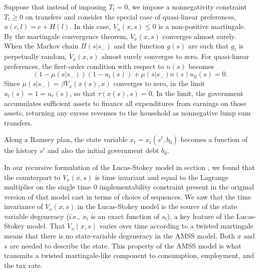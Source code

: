 \medskip

  Suppose that instead of imposing $T_t = 0$, we impose
a nonnegativity constraint $T_t\geq 0$ on  transfers and consider the special case of quasi-linear preferences,
$u(c,l)= c + H(l)$.   In this case,  $V_x(x,s)\leq 0$  is a non-positive martingale.  By the martingale convergence
 theorem, $V_x(x,s)$ converges almost surely.
%
When  the Markov chain $\Pi(s| s_-)$ and the function $g(s)$ are such that $g_t$ is perpetually random,
$V_x(x, s)$ almost surely converges to zero.  %
For  quasi-linear preferences, the first-order condition with respect to $n(s)$ becomes
$$ (1-\mu(s|s_-) ) (1 - u_l(s)) + \mu(s|s_-) n(s) u_{ll}(s) =0  .$$
Since $\mu(s|s_-) = \beta V_x(x(s),x) $ converges to zero, in the limit $u_l(s)= 1 =u_c(s)$, so that $\tau(x(s),s) =0$. In the limit, the government
accumulates sufficient assets
to finance all expenditures from earnings on those assets, returning any excess revenues to the household as nonnegative lump sum transfers.

\medskip


 Along a Ramsey plan, the state variable $x_t = x_t(s^t, b_0)$  becomes a function of the history $s^t$ and also
the initial government debt $b_0$.


\medskip

 In our recursive formulation of the  Lucas-Stokey model in section , we found that the counterpart to $V_x(x,s)$ is time invariant
and equal to
the Lagrange multiplier on the single time $0$ implementability constraint present in the original version of that model cast in terms of choice of sequences.
We saw that the time invariance of $V_x(x,s)$ in the Lucas-Stokey model is the source of the state variable degeneracy (i.e., $x_t$ is an exact function of
$s_t$), a key feature of the Lucas-Stokey model.
That $V_x(x,s)$ varies over time according to a twisted martingale means that there is no state-variable degeneracy in the AMSS model.
Both $x$ and $s$ are needed to describe the state.  This property of the
AMSS model is what transmits a twisted martingale-like component  to consumption, employment, and the tax rate.
\medskip


